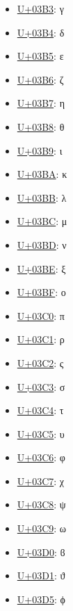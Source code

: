 \begin{itemize}
	\item \href{https://decodeunicode.org/en/u+03B3}{U+03B3}: γ
	\item \href{https://decodeunicode.org/en/u+03B4}{U+03B4}: δ
	\item \href{https://decodeunicode.org/en/u+03B5}{U+03B5}: ε
	\item \href{https://decodeunicode.org/en/u+03B6}{U+03B6}: ζ
	\item \href{https://decodeunicode.org/en/u+03B7}{U+03B7}: η
	\item \href{https://decodeunicode.org/en/u+03B8}{U+03B8}: θ
	\item \href{https://decodeunicode.org/en/u+03B9}{U+03B9}: ι
	\item \href{https://decodeunicode.org/en/u+03BA}{U+03BA}: κ
	\item \href{https://decodeunicode.org/en/u+03BB}{U+03BB}: λ
	\item \href{https://decodeunicode.org/en/u+03BC}{U+03BC}: μ
	\item \href{https://decodeunicode.org/en/u+03BD}{U+03BD}: ν
	\item \href{https://decodeunicode.org/en/u+03BE}{U+03BE}: ξ
	\item \href{https://decodeunicode.org/en/u+03BF}{U+03BF}: ο
	\item \href{https://decodeunicode.org/en/u+03C0}{U+03C0}: π
	\item \href{https://decodeunicode.org/en/u+03C1}{U+03C1}: ρ
	\item \href{https://decodeunicode.org/en/u+03C2}{U+03C2}: ς
	\item \href{https://decodeunicode.org/en/u+03C3}{U+03C3}: σ
	\item \href{https://decodeunicode.org/en/u+03C4}{U+03C4}: τ
	\item \href{https://decodeunicode.org/en/u+03C5}{U+03C5}: υ
	\item \href{https://decodeunicode.org/en/u+03C6}{U+03C6}: φ
	\item \href{https://decodeunicode.org/en/u+03C7}{U+03C7}: χ
	\item \href{https://decodeunicode.org/en/u+03C8}{U+03C8}: ψ
	\item \href{https://decodeunicode.org/en/u+03C9}{U+03C9}: ω
	\item \href{https://decodeunicode.org/en/u+03D0}{U+03D0}: ϐ
	\item \href{https://decodeunicode.org/en/u+03D1}{U+03D1}: ϑ
	\item \href{https://decodeunicode.org/en/u+03D5}{U+03D5}: ϕ

\end{itemize}
